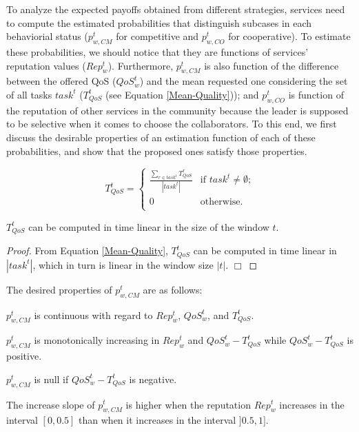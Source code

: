 To analyze the expected payoffs obtained from different
strategies, services need to compute the estimated probabilities
that distinguish subcases in each behaviorial status ($p_{w,CM}^t$
for competitive and $p_{w,CO}^t$ for cooperative). To estimate
these probabilities, we should notice that they are functions of
services' reputation values ($Rep_w^t$). Furthermore, $p_{w,CM}^t$
is also function of the difference between the offered QoS
($QoS_w^t$) and the mean requested one considering the set of all
tasks $task^t$ ($T_{QoS}^t$ (see Equation \ref{Mean-Quality}));
and $p_{w,CO}^t$ is function of the reputation of other services
in the community because the leader is supposed to be selective
when it comes to choose the collaborators. To this end, we first
discuss the desirable properties of an estimation function of each
of these probabilities, and show that the proposed ones satisfy
those properties.

\begin{equation}\label{Mean-Quality}
T_{QoS}^t =
\begin{cases} \frac{\sum_{r \in
task^t}T_{QoS}^r}{|task^t|}& \text{if $task^t \neq \emptyset$;}\\
0 & \text{otherwise.}\\
\end{cases}
\end{equation}
%

\begin{proposition}\label{Complexity-Mean_Quality}
$T_{QoS}^t$ can be computed in time linear in the size of the
window $t$.
\end{proposition}

\begin{proof}
From Equation \ref{Mean-Quality},  $T_{QoS}^t$ can be computed in
time linear in $|task^t|$, which in turn is linear in the window
size $|t|$. $\Box$

\end{proof}


The desired properties of $p_{w,CM}^t$ are as follows:

\begin{property}
$p_{w,CM}^t$ is continuous with regard to $Rep^t_w$, $QoS_w^t$,
and $T_{QoS}^t$.
\end{property}
%
\begin{property}
$p_{w,CM}^t$  is monotonically increasing in $Rep^t_w$ and
$QoS_w^t - T_{QoS}^t$ while $QoS_w^t - T_{QoS}^t$ is positive.
\end{property}
%
\begin{property}
$p_{w,CM}^t$ is null if $QoS_w^t - T_{QoS}^t$ is negative.
\end{property}
%
%
\begin{property}
The increase slope of $p_{w,CM}^t$ is higher when the reputation
$Rep^t_w$ increases in the interval $[0, 0.5]$ than when it
increases in the interval $]0.5, 1]$.
\end{property}


